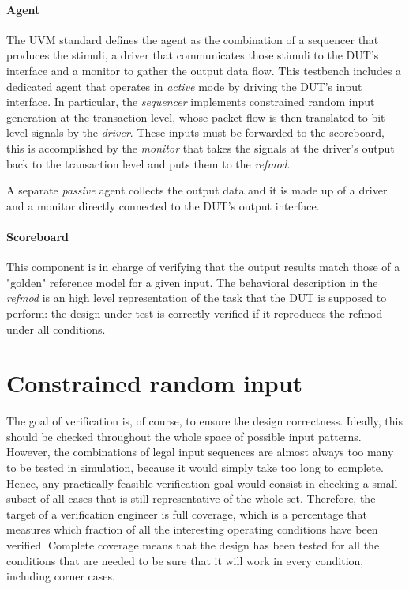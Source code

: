 \paragraph{Agent} The UVM standard defines the agent as the combination of a sequencer that produces the stimuli, a driver that communicates those stimuli to the DUT's interface and a monitor 
to gather the output data flow. This testbench includes a dedicated agent that operates in \textit{active} mode by driving the DUT's input interface. In particular, the \textit{sequencer} implements constrained random input generation at the transaction level, whose packet flow is then translated to bit-level signals by the \textit{driver}. These inputs must be forwarded to the scoreboard, this is accomplished by the \textit{monitor} that takes the signals at the driver's output back to the transaction level and puts them to the \textit{refmod}. 

A separate \textit{passive} agent collects the output data and it is made up of a driver and a monitor directly connected to the DUT's output interface.

\paragraph{Scoreboard} This component is in charge of verifying that the output results match those of a "golden" reference model for a given input. The behavioral description in the \textit{refmod} is an high level representation of the task that the DUT is supposed to perform: the design under test is correctly verified if it reproduces the refmod under all conditions.


\section{Constrained random input}
The goal of verification is, of course, to ensure the design correctness. Ideally, this should be checked throughout the whole space of possible input patterns. However, the combinations of legal input sequences are almost always too many to be tested in simulation, because it would simply take too long to complete. Hence, any practically feasible verification goal would consist in checking a small subset of all cases that is still representative of the whole set. Therefore, the target of a verification engineer is full coverage, which is a percentage that measures which fraction of all the interesting operating conditions have been verified. Complete coverage means that the design has been tested for all the conditions that are needed to be sure that it will work in every condition, including corner cases. 

